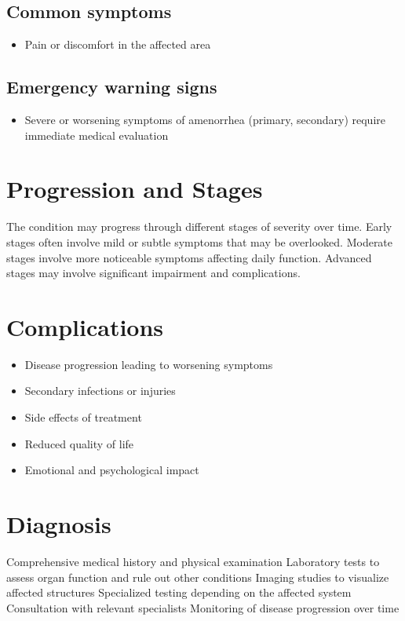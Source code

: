 \subsection{Common symptoms}
\begin{itemize}[noitemsep]
  \item Pain or discomfort in the affected area
  \end{itemize}

\subsection{Emergency warning signs}
\begin{itemize}[noitemsep]
  \item Severe or worsening symptoms of amenorrhea (primary, secondary) require immediate medical evaluation
\end{itemize}
\section{Progression and Stages}
The condition may progress through different stages of severity over time. Early stages often involve mild or subtle symptoms that may be overlooked. Moderate stages involve more noticeable symptoms affecting daily function. Advanced stages may involve significant impairment and complications.
\section{Complications}
\begin{itemize}[noitemsep]
  \item Disease progression leading to worsening symptoms
  \item Secondary infections or injuries
  \item Side effects of treatment
  \item Reduced quality of life
  \item Emotional and psychological impact
\end{itemize}
\section{Diagnosis}
Comprehensive medical history and physical examination Laboratory tests to assess organ function and rule out other conditions Imaging studies to visualize affected structures Specialized testing depending on the affected system Consultation with relevant specialists Monitoring of disease progression over time

